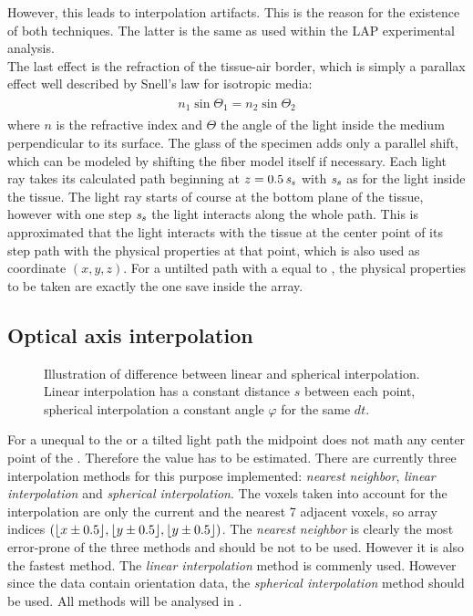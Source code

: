 However, this leads to interpolation artifacts.
This is the reason for the existence of both techniques.
The latter is the same as used within the \ac{LAP} experimental analysis.
\\
% 
The last effect is the refraction of the tissue-air border, which is simply a parallax effect well described by Snell's law for isotropic media:
\begin{align}
\begin{split}
    n_1 \sin{\Theta_1} = n_2 \sin{\Theta_2}
\end{split}
\label{equ:snell}
\end{align}
where $n$ is the refractive index and $\Theta$ the angle of the light inside the medium perpendicular to its surface.
The glass of the specimen adds only a parallel shift, which can be modeled by shifting the fiber model itself if necessary.
% 
% 
Each light ray takes its calculated path beginning at $z=\SI{0.5}{\textnormal{$\mathit{s_{s}}$}}$ with $\textnormal{$\mathit{s_{s}}$}$ as \stepsize{} for the light inside the tissue.
The light ray starts of course at the bottom plane of the tissue, however with one step $\textnormal{$\mathit{s_{s}}$}$ the light interacts along the whole path.
This is approximated that the light interacts with the tissue at the center point of its step path with the physical properties at that point, which is also used as coordinate $(x,y,z)$.
For a untilted path with a \stepsize{} equal to \voxelsize{}, the physical properties to be taken are exactly the one save inside the \opticalaxis{} array.
% 
\subsection{Optical axis interpolation}
% 
\begin{figure}[!t]
\centering
\def\tikzwidth{0.75*\textwidth}
\tikzset{external/export=false}
\caption[Illustration linear and spherical interpolation.]{Illustration of difference between linear and spherical interpolation. Linear interpolation has a constant distance $s$ between each point, spherical interpolation a constant angle $\varphi$ for the same $dt$.}
\label{fig:vectorfield_disc}
\end{figure}
% 
For a \stepsize{} unequal to the \voxelsize{} or a tilted light path the midpoint does not math any center point of the \opticalaxis{}.
Therefore the value has to be estimated.
There are currently three interpolation methods for this purpose implemented: \textit{nearest neighbor}, \textit{linear interpolation} and \textit{spherical interpolation}. 
The voxels taken into account for the interpolation are only the current and the nearest 7 adjacent voxels, so array indices $(\lfloor x\pm0.5\rfloor,\lfloor y\pm0.5\rfloor,\lfloor y\pm0.5\rfloor)$.
% 
The \textit{nearest neighbor} is clearly the most error-prone of the three methods and should be not to be used. 
However it is also the fastest method.
The \textit{linear interpolation} method is commenly used.
However since the data contain orientation data, the \textit{spherical interpolation} method should be used.
All methods will be analysed in \dummy{}.
% 
% 
